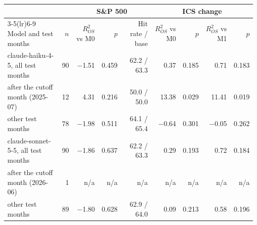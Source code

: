 \begin{tabular}{lrrrrrrrr}
\toprule
 &  & \multicolumn{3}{c}{S\&P 500} & \multicolumn{4}{c}{ICS change} \\
\cmidrule(lr){3-5}\cmidrule(lr){6-9}
Model and test months & $n$ & $R^2_{OS}$ vs M0 & $p$ & Hit rate / base & $R^2_{OS}$ vs M0 & $p$ & $R^2_{OS}$ vs M1 & $p$ \\
\midrule
claude-haiku-4-5, all test months & 90 & $-$1.51 & 0.459 & 62.2 / 63.3 & 0.37 & 0.185 & 0.71 & 0.183 \\
\quad after the cutoff month (2025-07) & 12 & 4.31 & 0.216 & 50.0 / 50.0 & 13.38 & 0.029 & 11.41 & 0.019 \\
\quad other test months & 78 & $-$1.98 & 0.511 & 64.1 / 65.4 & $-$0.64 & 0.301 & $-$0.05 & 0.262 \\
\midrule
claude-sonnet-5-5, all test months & 90 & $-$1.86 & 0.637 & 62.2 / 63.3 & 0.29 & 0.193 & 0.72 & 0.184 \\
\quad after the cutoff month (2026-06) & 1 & n/a & n/a & n/a & n/a & n/a & n/a & n/a \\
\quad other test months & 89 & $-$1.80 & 0.628 & 62.9 / 64.0 & 0.09 & 0.213 & 0.58 & 0.196 \\
\bottomrule
\end{tabular}
